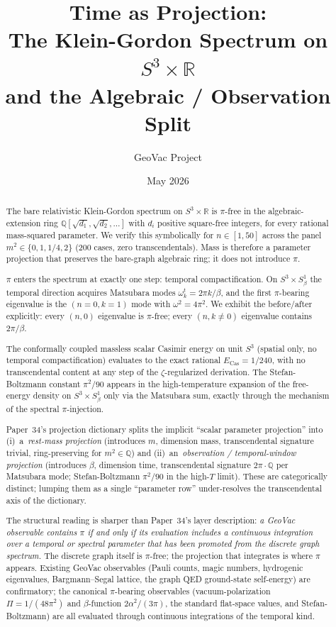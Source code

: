\documentclass[11pt]{article}
\title{Time as Projection:\\
The Klein-Gordon Spectrum on $S^3 \times \mathbb{R}$\\
and the Algebraic / Observation Split}
\author{GeoVac Project}
\date{May 2026}
\begin{document}
\maketitle

\begin{abstract}
The bare relativistic Klein-Gordon spectrum on $S^3 \times \mathbb{R}$
is $\pi$-free in the algebraic-extension ring
$\mathbb{Q}[\sqrt{d_1}, \sqrt{d_2}, \ldots]$ with $d_i$ positive
square-free integers, for every rational mass-squared parameter.  We
verify this symbolically for $n \in [1, 50]$ across the panel
$m^2 \in \{0, 1, 1/4, 2\}$ (200 cases, zero transcendentals).  Mass is
therefore a parameter projection that preserves the bare-graph algebraic
ring; it does not introduce $\pi$.

$\pi$ enters the spectrum at exactly one step: temporal compactification.
On $S^3 \times S^1_\beta$ the temporal direction acquires Matsubara modes
$\omega^t_k = 2\pi k / \beta$, and the first $\pi$-bearing eigenvalue is
the $(n{=}0, k{=}1)$ mode with $\omega^2 = 4\pi^2$.  We exhibit the
before/after explicitly: every $(n, 0)$ eigenvalue is $\pi$-free; every
$(n, k {\neq} 0)$ eigenvalue contains $2\pi/\beta$.

The conformally coupled massless scalar Casimir energy on unit $S^3$
(spatial only, no temporal compactification) evaluates to the exact
rational $E_\text{Cas} = 1/240$, with no transcendental content at any
step of the $\zeta$-regularized derivation.  The Stefan-Boltzmann
constant $\pi^2/90$ appears in the high-temperature expansion of the
free-energy density on $S^3 \times S^1_\beta$ only via the Matsubara
sum, exactly through the mechanism of the spectral $\pi$-injection.

Paper~34's projection dictionary splits the implicit ``scalar
parameter projection'' into
(i)~a~\emph{rest-mass projection} (introduces $m$, dimension mass,
transcendental signature trivial, ring-preserving for $m^2 \in
\mathbb{Q}$) and (ii)~an~\emph{observation / temporal-window projection}
(introduces $\beta$, dimension time, transcendental signature
$2\pi \cdot \mathbb{Q}$ per Matsubara mode; Stefan-Boltzmann
$\pi^2/90$ in the high-$T$ limit).  These are categorically distinct;
lumping them as a single ``parameter row'' under-resolves the
transcendental axis of the dictionary.

The structural reading is sharper than Paper~34's layer description:
\emph{a GeoVac observable contains $\pi$ if and only if its evaluation
includes a continuous integration over a temporal or spectral parameter
that has been promoted from the discrete graph spectrum.}  The discrete
graph itself is $\pi$-free; the projection that integrates is where
$\pi$ appears.  Existing GeoVac observables (Pauli counts, magic
numbers, hydrogenic eigenvalues, Bargmann--Segal lattice, the graph
QED ground-state self-energy) are confirmatory; the canonical $\pi$-bearing observables
(vacuum-polarization $\Pi = 1/(48\pi^2)$ and $\beta$-function
$2\alpha^2/(3\pi)$, the standard flat-space values,
and Stefan-Boltzmann) are all evaluated through
continuous integrations of the temporal kind.


\end{abstract}
\end{document}
